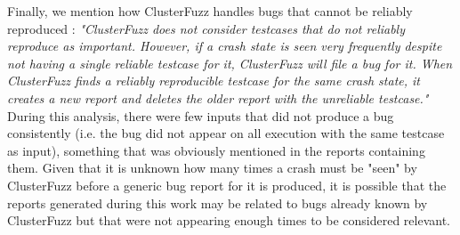 Finally, we mention how ClusterFuzz handles bugs that cannot be reliably reproduced \cite{unreliable}: \textit{"ClusterFuzz does not consider testcases that do not reliably reproduce as important. However, if a crash state is seen very frequently despite not having a single reliable testcase for it, ClusterFuzz will file a bug for it. When ClusterFuzz finds a reliably reproducible testcase for the same crash state, it creates a new report and deletes the older report with the unreliable testcase."} During this analysis, there were few inputs that did not produce a bug consistently (i.e. the bug did not appear on all execution with the same testcase as input), something that was obviously mentioned in the reports containing them. Given that it is unknown how many times a crash must be "seen" by ClusterFuzz before a generic bug report for it is produced, it is possible that the reports generated during this work may be related to bugs already known by ClusterFuzz but that were not appearing enough times to be considered relevant.



